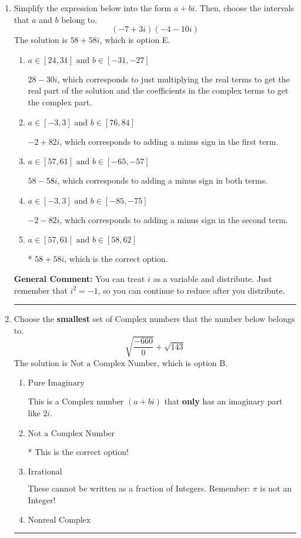 \documentclass{extbook}[14pt]
\newcommand{\litem}[1]{\item #1

\rule{\textwidth}{0.4pt}}
\begin{document}
\begin{enumerate}\litem{
Simplify the expression below into the form $a+bi$. Then, choose the intervals that $a$ and $b$ belong to.
\[ (-7 + 3 i)(-4 - 10 i) \]
The solution is \( 58 + 58 i \), which is option E.\begin{enumerate}[label=\Alph*.]
\item \( a \in [24, 31] \text{ and } b \in [-31, -27] \)

 $28 - 30 i$, which corresponds to just multiplying the real terms to get the real part of the solution and the coefficients in the complex terms to get the complex part.
\item \( a \in [-3, 3] \text{ and } b \in [76, 84] \)

 $-2 + 82 i$, which corresponds to adding a minus sign in the first term.
\item \( a \in [57, 61] \text{ and } b \in [-65, -57] \)

 $58 - 58 i$, which corresponds to adding a minus sign in both terms.
\item \( a \in [-3, 3] \text{ and } b \in [-85, -75] \)

 $-2 - 82 i$, which corresponds to adding a minus sign in the second term.
\item \( a \in [57, 61] \text{ and } b \in [58, 62] \)

* $58 + 58 i$, which is the correct option.
\end{enumerate}

\textbf{General Comment:} You can treat $i$ as a variable and distribute. Just remember that $i^2=-1$, so you can continue to reduce after you distribute.
}
\litem{
Choose the \textbf{smallest} set of Complex numbers that the number below belongs to.
\[ \sqrt{\frac{-660}{0}}+\sqrt{143} \]
The solution is \( \text{Not a Complex Number} \), which is option B.\begin{enumerate}[label=\Alph*.]
\item \( \text{Pure Imaginary} \)

This is a Complex number $(a+bi)$ that \textbf{only} has an imaginary part like $2i$.
\item \( \text{Not a Complex Number} \)

* This is the correct option!
\item \( \text{Irrational} \)

These cannot be written as a fraction of Integers. Remember: $\pi$ is not an Integer!
\item \( \text{Nonreal Complex} \)


\end{enumerate}}
\end{enumerate}
\end{document}
